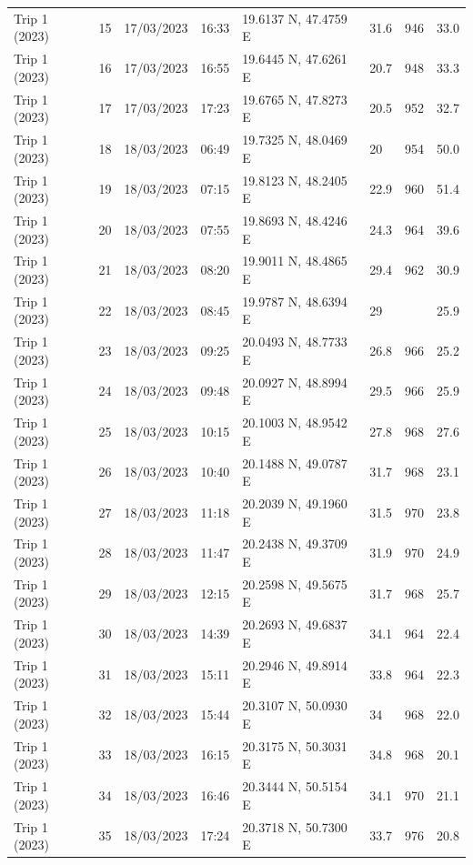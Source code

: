 \begin{scriptsize}
\begin{longtable}{llllllll}
Trip 1 (2023) & 15 & 17/03/2023 & 16:33 & 19.6137 N, 47.4759 E & 31.6 & 946 & 33.0 \\
Trip 1 (2023) & 16 & 17/03/2023 & 16:55 & 19.6445 N, 47.6261 E & 20.7 & 948 & 33.3 \\
Trip 1 (2023) & 17 & 17/03/2023 & 17:23 & 19.6765 N, 47.8273 E & 20.5 & 952 & 32.7 \\
Trip 1 (2023) & 18 & 18/03/2023 & 06:49 & 19.7325 N, 48.0469 E & 20 & 954 & 50.0 \\
Trip 1 (2023) & 19 & 18/03/2023 & 07:15 & 19.8123 N, 48.2405 E & 22.9 & 960 & 51.4 \\
Trip 1 (2023) & 20 & 18/03/2023 & 07:55 & 19.8693 N, 48.4246 E & 24.3 & 964 & 39.6 \\
Trip 1 (2023) & 21 & 18/03/2023 & 08:20 & 19.9011 N, 48.4865 E & 29.4 & 962 & 30.9 \\
Trip 1 (2023) & 22 & 18/03/2023 & 08:45 & 19.9787 N, 48.6394 E & 29 & \textemdash{} & 25.9 \\
Trip 1 (2023) & 23 & 18/03/2023 & 09:25 & 20.0493 N, 48.7733 E & 26.8 & 966 & 25.2 \\
Trip 1 (2023) & 24 & 18/03/2023 & 09:48 & 20.0927 N, 48.8994 E & 29.5 & 966 & 25.9 \\
Trip 1 (2023) & 25 & 18/03/2023 & 10:15 & 20.1003 N, 48.9542 E & 27.8 & 968 & 27.6 \\
Trip 1 (2023) & 26 & 18/03/2023 & 10:40 & 20.1488 N, 49.0787 E & 31.7 & 968 & 23.1 \\
Trip 1 (2023) & 27 & 18/03/2023 & 11:18 & 20.2039 N, 49.1960 E & 31.5 & 970 & 23.8 \\
Trip 1 (2023) & 28 & 18/03/2023 & 11:47 & 20.2438 N, 49.3709 E & 31.9 & 970 & 24.9 \\
Trip 1 (2023) & 29 & 18/03/2023 & 12:15 & 20.2598 N, 49.5675 E & 31.7 & 968 & 25.7 \\
Trip 1 (2023) & 30 & 18/03/2023 & 14:39 & 20.2693 N, 49.6837 E & 34.1 & 964 & 22.4 \\
Trip 1 (2023) & 31 & 18/03/2023 & 15:11 & 20.2946 N, 49.8914 E & 33.8 & 964 & 22.3 \\
Trip 1 (2023) & 32 & 18/03/2023 & 15:44 & 20.3107 N, 50.0930 E & 34 & 968 & 22.0 \\
Trip 1 (2023) & 33 & 18/03/2023 & 16:15 & 20.3175 N, 50.3031 E & 34.8 & 968 & 20.1 \\
Trip 1 (2023) & 34 & 18/03/2023 & 16:46 & 20.3444 N, 50.5154 E & 34.1 & 970 & 21.1 \\
Trip 1 (2023) & 35 & 18/03/2023 & 17:24 & 20.3718 N, 50.7300 E & 33.7 & 976 & 20.8 \\

\end{longtable}
\end{scriptsize}
